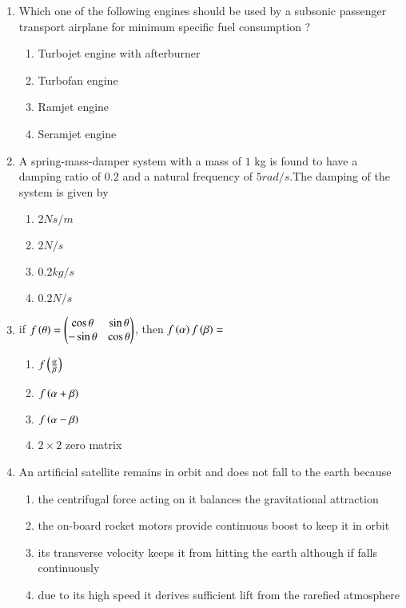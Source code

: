 \documentclass[journal]{IEEEtran}
\begin{document}
 \begin{enumerate}
     \item Which one of the following engines should be used by a subsonic passenger transport airplane for minimum specific fuel consumption ?
     \begin{enumerate}
         \item Turbojet engine with afterburner
         \item Turbofan engine
         \item Ramjet engine
         \item Seramjet engine\\
     \end{enumerate}

     \item A spring-mass-damper system with a mass of $1$ kg is found to have a damping ratio of $0.2$ and a natural frequency of $5 rad/s$.The damping of the system is given by
     \begin{enumerate}
         \item $2 Ns/m$
         \item $2 N/s$
         \item $0.2 kg/s$
         \item $0.2 N/s$ \\    
     \end{enumerate}

    \item if $f\left(\theta\right) = \begin{pmatrix} \cos\theta & \sin\theta \\ -\sin\theta & \cos\theta\end{pmatrix}$, then $f\left(\alpha\right) f\left(\beta\right) =$
    \begin{enumerate}
        \item $f\left(\frac{\alpha}{\beta}\right)$
        \item $f\left(\alpha +\beta\right)$
        \item $f\left(\alpha - \beta\right)$
        \item $2 \times 2 $ zero matrix \\     
    \end{enumerate}

    \item An artificial satellite remains in orbit and does not fall to the earth because 
    \begin{enumerate}
        \item the centrifugal force acting on it balances the gravitational attraction
        \item the on-board rocket motors provide continuous boost to keep it in orbit
        \item its transverse velocity keeps it from hitting the earth although if falls continuously
        \item due to its high speed it derives sufficient lift from the rarefied atmosphere \\
    \end{enumerate}
     

\end{enumerate}
\end{document}
